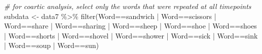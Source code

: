 \documentclass[
]{article}
\newenvironment{Shaded}{\begin{snugshade}}{\end{snugshade}}
\newcommand{\CommentTok}[1]{\textcolor[rgb]{0.56,0.35,0.01}{\textit{#1}}}
\newcommand{\FunctionTok}[1]{\textcolor[rgb]{0.00,0.00,0.00}{#1}}
\newcommand{\NormalTok}[1]{#1}
\newcommand{\OtherTok}[1]{\textcolor[rgb]{0.56,0.35,0.01}{#1}}
\newcommand{\SpecialCharTok}[1]{\textcolor[rgb]{0.00,0.00,0.00}{#1}}
\newcommand{\StringTok}[1]{\textcolor[rgb]{0.31,0.60,0.02}{#1}}
\begin{document}
\begin{Shaded}
\begin{Highlighting}[]
\CommentTok{\# for coartic analysis, select only the words that were repeated at all timepoints }
\NormalTok{subdata }\OtherTok{\textless{}{-}}\NormalTok{ data7 }\SpecialCharTok{\%\textgreater{}\%}
  \FunctionTok{filter}\NormalTok{(Word}\SpecialCharTok{==}\StringTok{\textquotesingle{}sandwich\textquotesingle{}} \SpecialCharTok{|}\NormalTok{ Word}\SpecialCharTok{==}\StringTok{\textquotesingle{}scissors\textquotesingle{}} \SpecialCharTok{|}\NormalTok{ Word}\SpecialCharTok{==}\StringTok{\textquotesingle{}share\textquotesingle{}} \SpecialCharTok{|} 
\NormalTok{           Word}\SpecialCharTok{==}\StringTok{\textquotesingle{}sharing\textquotesingle{}} \SpecialCharTok{|}\NormalTok{ Word}\SpecialCharTok{==}\StringTok{\textquotesingle{}sheep\textquotesingle{}} \SpecialCharTok{|}\NormalTok{ Word}\SpecialCharTok{==}\StringTok{\textquotesingle{}shoe\textquotesingle{}} \SpecialCharTok{|}\NormalTok{ Word}\SpecialCharTok{==}\StringTok{\textquotesingle{}shoes\textquotesingle{}} \SpecialCharTok{|} 
\NormalTok{           Word}\SpecialCharTok{==}\StringTok{\textquotesingle{}shorts\textquotesingle{}} \SpecialCharTok{|}\NormalTok{ Word}\SpecialCharTok{==}\StringTok{\textquotesingle{}shovel\textquotesingle{}} \SpecialCharTok{|}\NormalTok{ Word}\SpecialCharTok{==}\StringTok{\textquotesingle{}shower\textquotesingle{}} \SpecialCharTok{|}\NormalTok{ Word}\SpecialCharTok{==}\StringTok{\textquotesingle{}sick\textquotesingle{}} \SpecialCharTok{|} 
\NormalTok{           Word}\SpecialCharTok{==}\StringTok{\textquotesingle{}sink\textquotesingle{}} \SpecialCharTok{|}\NormalTok{ Word}\SpecialCharTok{==}\StringTok{\textquotesingle{}soup\textquotesingle{}} \SpecialCharTok{|}
\NormalTok{         Word}\SpecialCharTok{==}\StringTok{\textquotesingle{}sun\textquotesingle{}}\NormalTok{)}
\end{Highlighting}
\end{Shaded}
\end{document}
